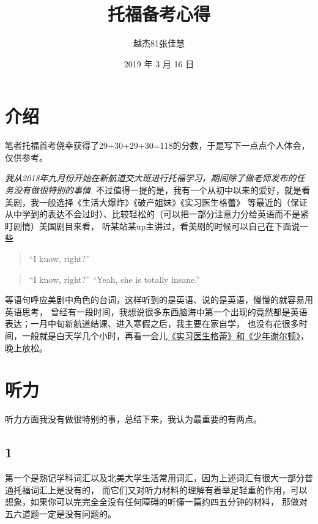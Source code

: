 \documentclass[blue,pad,cn]{elegantnote}
\title{托福备考心得}
\author{越杰81张佳慧}
\institute{小破楼资料编写小组\LaTeX}
\date{2019 年 3 月 16 日}
\begin{document}
\maketitle
\newpage
\tableofcontents
\newpage
\section{介绍}

    \begin{flushright}
        笔者托福首考侥幸获得了29+30+29+30=118的分数，于是写下一点点个人体会，仅供参考。
    \end{flushright}
    
    \emph{我从2018年九月份开始在新航道交大班进行托福学习，期间除了做老师发布的任务没有做很特别的事情.}
    不过值得一提的是，我有一个从初中以来的爱好，就是看美剧，我一般选择《生活大爆炸》《破产姐妹》《实习医生格蕾》
    等最近的（保证从中学到的表达不会过时）、比较轻松的（可以把一部分注意力分给英语而不是紧盯剧情）美国剧目来看，
    听某站某up主讲过，看美剧的时候可以自己在下面说一些
    
    \begin{quote}
        “I know, right?” 
    \end{quote}

    \begin{quotation}
        “I know, right?” 
        “Yeah, she is totally insane.”
    \end{quotation}
    
    等语句呼应美剧中角色的台词，这样听到的是英语、说的是英语，慢慢的就容易用英语思考，
    曾经有一段时间，我想说很多东西脑海中第一个出现的竟然都是英语表达；一月中旬新航道结课、进入寒假之后，我主要在家自学，
    也没有花很多时间，一般就是白天学几个小时，再看一会儿\underline{《实习医生格蕾》和《少年谢尔顿》}，晚上放松。

\section{听力}

    听力方面我没有做很特别的事，总结下来，我认为最重要的有两点。

\subsection{1}
    第一个是熟记学科词汇以及北美大学生活常用词汇，因为上述词汇有很大一部分普通托福词汇上是没有的，
    而它们又对听力材料的理解有着举足轻重的作用，可以想象，如果你可以完完全全没有任何障碍的听懂一篇约四五分钟的材料，
    那做对五六道题一定是没有问题的。
\end{document}
